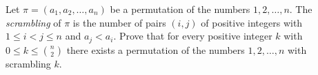 Let $\pi=(a_1,a_2,\ldots,a_n)$ be a permutation of the numbers $1,2,\ldots,n$.
The \emph{scrambling} of $\pi$ is the number of pairs $(i,j)$ of positive integers
with $1 \leq i < j \leq n$ and $a_j<a_i$. Prove that for every positive integer
$k$ with $0 \leq k \leq \binom{n}{2}$ there exists a permutation of
the numbers $1,2,\ldots,n$ with scrambling $k$.
